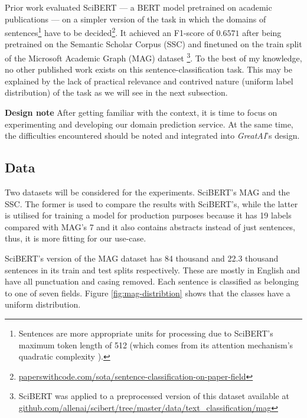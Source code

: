 Prior work evaluated SciBERT \cite{beltagy2019scibert} --- a BERT \cite{devlin2018bert} model pretrained on academic publications --- on a simpler version of the task in which the domains of sentences\footnote{Sentences are more appropriate units for processing due to SciBERT's maximum token length of 512 (which comes from its attention mechanism's quadratic complexity \cite{vaswani2017attention}).} have to be decided\footnote{\href{https://paperswithcode.com/sota/sentence-classification-on-paper-field}{paperswithcode.com/sota/sentence-classification-on-paper-field}}. It achieved an F1-score of $0.6571$ after being pretrained on the Semantic Scholar Corpus (SSC) \cite{Lo2020S2ORCTS} and finetuned on the train split of the Microsoft Academic Graph (MAG) dataset \cite{wang2019review}\footnote{SciBERT was applied to a preprocessed version of this dataset available at \href{https://github.com/allenai/scibert/tree/master/data/text_classification/mag}{github.com/allenai/scibert/tree/master/data/text\_classification/mag}}. To the best of my knowledge, no other published work exists on this sentence-classification task. This may be explained by the lack of practical relevance and contrived nature (uniform label distribution) of the task as we will see in the next subsection.

\begin{displayquote}
\textbf{Design note} After getting familiar with the context, it is time to focus on experimenting and developing our domain prediction service. At the same time, the difficulties encountered should be noted and integrated into \textit{GreatAI}'s design.
\end{displayquote}

\subsection{Data}

Two datasets will be considered for the experiments. SciBERT's MAG and the SSC. The former is used to compare the results with SciBERT's, while the latter is utilised for training a model for production purposes because it has 19 labels compared with MAG's 7 and it also contains abstracts instead of just sentences, thus, it is more fitting for our use-case.

SciBERT's version of the MAG dataset has 84 thousand and 22.3 thousand sentences in its train and test splits respectively. These are mostly in English and have all punctuation and casing removed. Each sentence is classified as belonging to one of seven fields. Figure \ref{fig:mag-distribtion} shows that the classes have a uniform distribution. 

